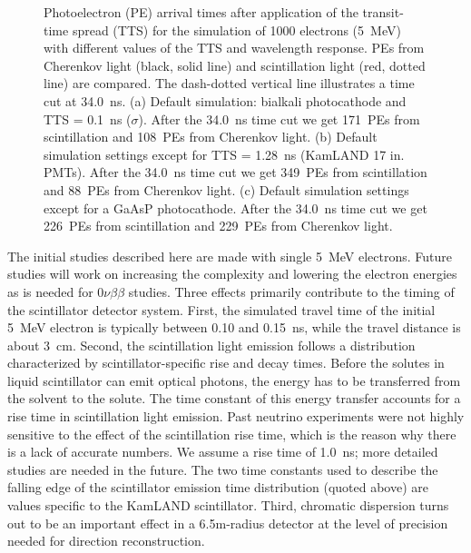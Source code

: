 \documentclass[aps,prc,twocolumn,groupedaddress,showpacs,amsmath,amssymb,floatfix,superscriptaddress]{revtex4}
\begin{document}
\begin{figure*}[tbh]
\begin{center}
        \caption[]{Photoelectron (PE) arrival times after application
        of the transit-time spread (TTS) for the simulation
        of 1000 electrons (5~MeV) with different values of the TTS and
        wavelength response. PEs from
        Cherenkov light (black, solid line) and scintillation light
        (red, dotted line) are
        compared. The dash-dotted vertical line illustrates a time cut at
        34.0~ns. (a) Default simulation: bialkali photocathode and TTS =
        0.1~ns ($\sigma$). After the 34.0~ns time cut we get 171~PEs
        from scintillation and 108~PEs from Cherenkov light. (b)
        Default simulation settings except for TTS = 1.28~ns (KamLAND
        17 in. PMTs). After the 34.0~ns time cut we get 349~PEs from
        scintillation and 88~PEs from Cherenkov light. (c) Default
        simulation settings except for a GaAsP photocathode. After the
        34.0~ns time cut we get 226~PEs from scintillation and 229~PEs
        from Cherenkov light. \label{time_plots_comparison}}
        \end{center}
\end{figure*}

The initial studies described here are made with single 5~MeV electrons. 
Future studies will work on increasing the complexity and lowering 
the electron energies as is needed for $0\nu\beta\beta$ studies. Three 
effects primarily contribute to the timing of the scintillator detector 
system. First, the simulated travel time of the initial 5~MeV electron is typically between
0.10 and 0.15~ns, while the travel distance is about 3~cm. Second, the
scintillation light emission follows a distribution characterized by
scintillator-specific rise and decay times. Before the solutes in
liquid scintillator can emit optical photons, the energy has to be
transferred from the solvent to the solute. The time constant of this
energy transfer accounts for a rise time in scintillation light
emission. Past neutrino experiments were not highly sensitive to the
effect of the scintillation rise time, which is the reason why there
is a lack of accurate numbers. We assume a rise time of 1.0~ns; more
detailed studies are needed in the future. The two time constants used
to describe the falling edge of the scintillator emission time
distribution (quoted above) are values specific to the KamLAND
scintillator. Third, chromatic dispersion turns out to be an important
effect in a 6.5m-radius detector at the level of precision needed for
direction reconstruction. 
\end{document}
